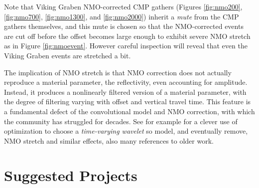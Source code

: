 
Note that Viking Graben NMO-corrected CMP gathers (Figures \ref{fig:nmo200}, \ref{fig:nmo700}, \ref{fig:nmo1300}, and \ref{fig:nmo2000}) inherit a {\em mute} from the CMP gathers themselves, and this mute is chosen so that the NMO-corrected events are cut off before the offset becomes large enough to exhibit severe NMO stretch as in Figure \ref{fig:nmoevent}. However careful inspection will reveal that even the Viking Graben events are stretched a bit. 

The implication of NMO stretch is that NMO correction does not actually reproduce a material parameter, the reflectivity, even accounting for amplitude. Instead, it produces a nonlinearly filtered version of a material parameter, with the degree of filtering varying with offset and vertical travel time. This feature is a fundamental defect of the convolutional model and NMO correction, with which the community has struggled for decades. See for example \cite{Harlan:14} for a clever use of optimization to choose a {\em time-varying wavelet} so model, and eventually remove, NMO stretch and similar effects, also many references to older work.  


\section{Suggested Projects}

